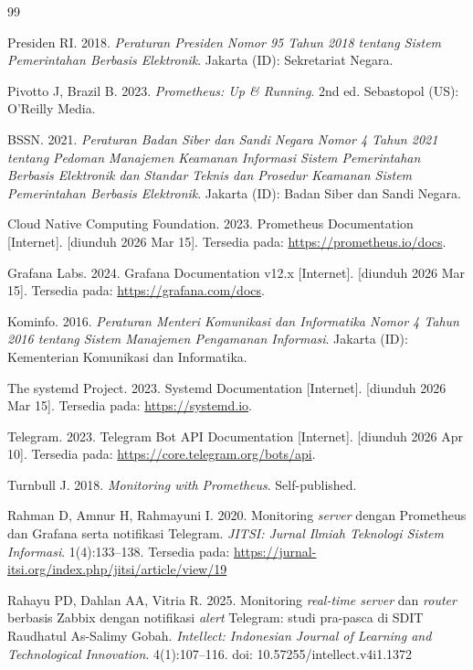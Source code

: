 \documentclass[10pt,twocolumn]{article}
\begin{document}
\begin{thebibliography}{99}

  Presiden RI. 2018.
  \textit{Peraturan Presiden Nomor 95 Tahun 2018 tentang Sistem Pemerintahan Berbasis Elektronik}.
  Jakarta (ID): Sekretariat Negara.

  Pivotto J, Brazil B. 2023.
  \textit{Prometheus: Up \& Running}. 2nd ed.
  Sebastopol (US): O'Reilly Media.

  BSSN. 2021.
  \textit{Peraturan Badan Siber dan Sandi Negara Nomor 4 Tahun 2021 tentang Pedoman Manajemen
  Keamanan Informasi Sistem Pemerintahan Berbasis Elektronik dan Standar Teknis dan Prosedur
  Keamanan Sistem Pemerintahan Berbasis Elektronik}.
  Jakarta (ID): Badan Siber dan Sandi Negara.

  Cloud Native Computing Foundation. 2023.
  Prometheus Documentation [Internet]. [diunduh 2026 Mar 15].
  Tersedia pada: \url{https://prometheus.io/docs}.

  Grafana Labs. 2024.
  Grafana Documentation v12.x [Internet]. [diunduh 2026 Mar 15].
  Tersedia pada: \url{https://grafana.com/docs}.

  Kominfo. 2016.
  \textit{Peraturan Menteri Komunikasi dan Informatika Nomor 4 Tahun 2016 tentang
  Sistem Manajemen Pengamanan Informasi}.
  Jakarta (ID): Kementerian Komunikasi dan Informatika.

  The systemd Project. 2023.
  Systemd Documentation [Internet]. [diunduh 2026 Mar 15].
  Tersedia pada: \url{https://systemd.io}.

  Telegram. 2023.
  Telegram Bot API Documentation [Internet]. [diunduh 2026 Apr 10].
  Tersedia pada: \url{https://core.telegram.org/bots/api}.

  Turnbull J. 2018.
  \textit{Monitoring with Prometheus}.
  Self-published.

  Rahman D, Amnur H, Rahmayuni I. 2020.
  Monitoring \textit{server} dengan Prometheus dan Grafana serta notifikasi Telegram.
  \textit{JITSI: Jurnal Ilmiah Teknologi Sistem Informasi}. 1(4):133--138.
  Tersedia pada: \url{https://jurnal-itsi.org/index.php/jitsi/article/view/19}

  Rahayu PD, Dahlan AA, Vitria R. 2025.
  Monitoring \textit{real-time server} dan \textit{router} berbasis Zabbix dengan notifikasi
  \textit{alert} Telegram: studi pra-pasca di SDIT Raudhatul As-Salimy Gobah.
  \textit{Intellect: Indonesian Journal of Learning and Technological Innovation}. 4(1):107--116.
  doi: 10.57255/intellect.v4i1.1372

\end{thebibliography}
\end{document}
